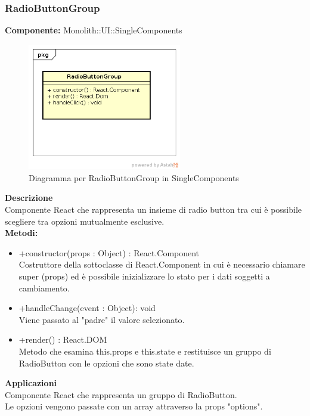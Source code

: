 \clearpage

\subsubsection{RadioButtonGroup}
\textbf{Componente:}  Monolith::UI::SingleComponents\\
   \FloatBarrier
   \begin{figure}[ht]
   \centering
   \includegraphics[width=0.6\textwidth]{img/single-RadioButtonGroup}
   \caption{{Diagramma per RadioButtonGroup in SingleComponents}}
\end{figure}
\FloatBarrier
\textbf{Descrizione}\\
Componente React che rappresenta un insieme di radio button tra cui è possibile scegliere tra opzioni mutualmente esclusive.\\

\textbf{Metodi:} 
\begin{itemize}
\item +constructor(props : Object) : React.Component 
\\
Costruttore della sottoclasse di React.Component in cui è necessario chiamare super (props) ed è possibile inizializzare lo stato per i dati soggetti a cambiamento.

\item +handleChange(event : Object): void 
\\
Viene passato al "padre" il valore selezionato.

\item +render() : React.DOM 
\\
Metodo che esamina this.props e this.state e restituisce un gruppo di RadioButton con le opzioni che sono state date.

\end{itemize} 


\textbf{Applicazioni}\\
Componente React che rappresenta un gruppo di RadioButton. \\ Le opzioni vengono passate con un array attraverso la props "options". 


